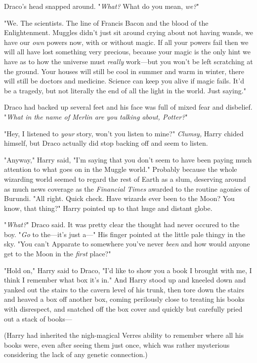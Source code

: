 Draco's head snapped around. "\emph{What?} What do you mean, \emph{we?}"

"We. The scientists. The line of Francis Bacon and the blood of the 
Enlightenment. Muggles didn't just sit around crying about not having wands, we 
have our \emph{own} powers now, with or without magic. If all your powers fail 
then we will all have lost something very precious, because your magic is the 
only hint we have as to how the universe must \emph{really} work---but you 
won't be left scratching at the ground. Your houses will still be cool in 
summer and warm in winter, there will still be doctors and medicine. Science 
can keep you alive if magic fails. It'd be a tragedy, but not literally the end 
of all the light in the world. Just saying."

Draco had backed up several feet and his face was full of mixed fear and 
disbelief. "\emph{What in the name of Merlin are you talking about, Potter?}"

"Hey, I listened to \emph{your} story, won't you listen to mine?" 
\emph{Clumsy,} Harry chided himself, but Draco actually did stop backing off 
and seem to listen.

"Anyway," Harry said, "I'm saying that you don't seem to have been paying much 
attention to what goes on in the Muggle world." Probably because the whole 
wizarding world seemed to regard the rest of Earth as a slum, deserving around 
as much news coverage as the \emph{Financial Times} awarded to the routine 
agonies of Burundi. "All right. Quick check. Have wizards ever been to the 
Moon? You know, that thing?" Harry pointed up to that huge and distant globe.

"\emph{What?}" Draco said. It was pretty clear the thought had never occured to 
the boy. "\emph{Go} to the---it's just a---" His finger pointed at the little 
pale thingy in the sky. "You can't Apparate to somewhere you've never 
\emph{been} and how would anyone get to the Moon in the \emph{first} place?"

"Hold on," Harry said to Draco, "I'd like to show you a book I brought with me, 
I think I remember what box it's in." And Harry stood up and kneeled down and 
yanked out the stairs to the cavern level of his trunk, then tore down the 
stairs and heaved a box off another box, coming perilously close to treating 
his books with disrespect, and snatched off the box cover and quickly but 
carefully pried out a stack of books---

(Harry had inherited the nigh-magical Verres ability to remember where all his 
books were, even after seeing them just once, which was rather mysterious 
considering the lack of any genetic connection.)


